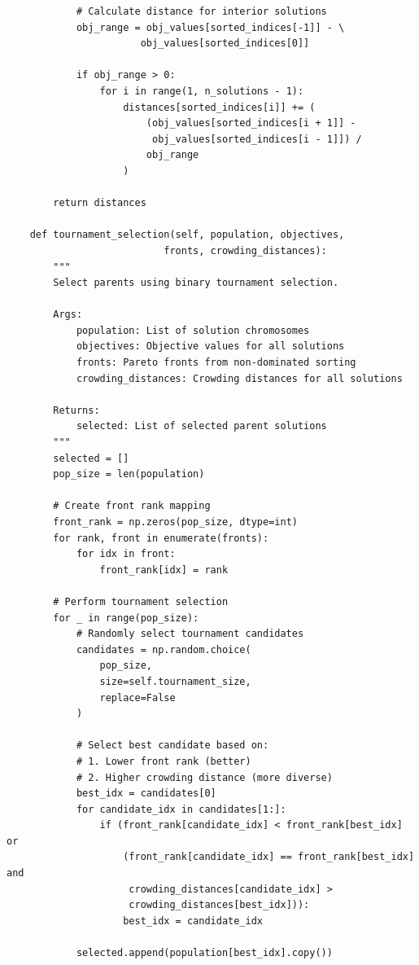 \begin{lstlisting}
            # Calculate distance for interior solutions
            obj_range = obj_values[sorted_indices[-1]] - \
                       obj_values[sorted_indices[0]]
            
            if obj_range > 0:
                for i in range(1, n_solutions - 1):
                    distances[sorted_indices[i]] += (
                        (obj_values[sorted_indices[i + 1]] -
                         obj_values[sorted_indices[i - 1]]) /
                        obj_range
                    )
        
        return distances
    
    def tournament_selection(self, population, objectives, 
                           fronts, crowding_distances):
        """
        Select parents using binary tournament selection.
        
        Args:
            population: List of solution chromosomes
            objectives: Objective values for all solutions
            fronts: Pareto fronts from non-dominated sorting
            crowding_distances: Crowding distances for all solutions
            
        Returns:
            selected: List of selected parent solutions
        """
        selected = []
        pop_size = len(population)
        
        # Create front rank mapping
        front_rank = np.zeros(pop_size, dtype=int)
        for rank, front in enumerate(fronts):
            for idx in front:
                front_rank[idx] = rank
        
        # Perform tournament selection
        for _ in range(pop_size):
            # Randomly select tournament candidates
            candidates = np.random.choice(
                pop_size, 
                size=self.tournament_size, 
                replace=False
            )
            
            # Select best candidate based on:
            # 1. Lower front rank (better)
            # 2. Higher crowding distance (more diverse)
            best_idx = candidates[0]
            for candidate_idx in candidates[1:]:
                if (front_rank[candidate_idx] < front_rank[best_idx] or
                    (front_rank[candidate_idx] == front_rank[best_idx] and
                     crowding_distances[candidate_idx] > 
                     crowding_distances[best_idx])):
                    best_idx = candidate_idx
            
            selected.append(population[best_idx].copy())
        

\end{lstlisting}
